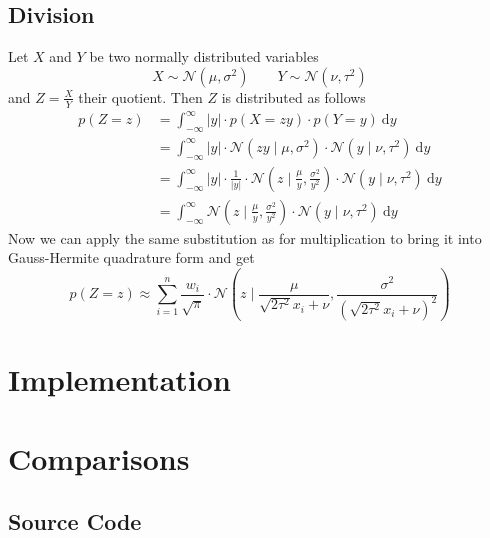 \documentclass[11pt,a4paper]{book}
\begin{document}
\section{Division}

Let $X$ and $Y$ be two normally distributed variables
\begin{equation*}
  X \sim \mathcal{N}(\mu, \sigma^{2}) \qquad Y \sim \mathcal{N}(\nu, \tau^{2})
\end{equation*}
and $Z = \frac{X}{Y}$ their quotient. Then $Z$ is distributed as follows
\begin{align*}
  p(Z = z) & = \int_{-\infty}^{\infty} |y| \cdot p\left(X = zy\right) \cdot p(Y = y)~\mathrm{d}y\\
           & = \int_{-\infty}^{\infty} |y| \cdot \mathcal{N}\left( zy \mid \mu, \sigma^{2} \right) \cdot \mathcal{N}(y \mid \nu, \tau^{2})~\mathrm{d}y\\
           & = \int_{-\infty}^{\infty} |y| \cdot \frac{1}{|y|} \cdot \mathcal{N}\left( z \mid \frac{\mu}{y}, \frac{\sigma^{2}}{y^{2}} \right) \cdot \mathcal{N}(y \mid \nu, \tau^{2})~\mathrm{d}y\\
           & = \int_{-\infty}^{\infty} \mathcal{N}\left( z \mid \frac{\mu}{y}, \frac{\sigma^{2}}{y^{2}} \right) \cdot \mathcal{N}(y \mid \nu, \tau^{2})~\mathrm{d}y
\end{align*}
Now we can apply the same substitution as for multiplication to bring it into
Gauss-Hermite quadrature form and get
\begin{equation*}
  p(Z = z) \approx \sum_{i = 1}^{n} \frac{w_{i}}{\sqrt{\pi}} \cdot \mathcal{N}\left( z \mid \frac{\mu}{\sqrt{2 \tau^{2}} x_{i} + \nu}, \frac{\sigma^{2}}{\left(\sqrt{2 \tau^{2}} x_{i} + \nu\right)^{2}} \right)
\end{equation*}

\chapter{Implementation}
\label{ch:implementation}

\chapter{Comparisons}
\label{ch:comparisons}

\begin{appendices}
  \chapter{Source Code}
  \label{ch:source}

  \inputminted{julia}{src/Transforms.jl}
\end{appendices}
\end{document}
